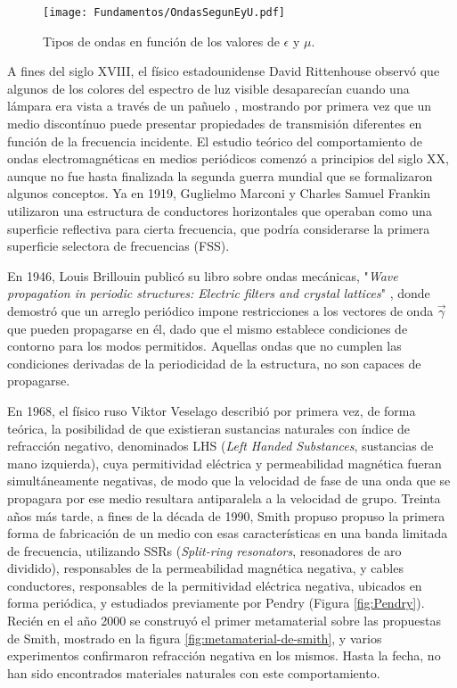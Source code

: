 \begin{figure}[htp]
	\centering
	\texttt{[image: Fundamentos/OndasSegunEyU.pdf]}
	\caption{Tipos de ondas en función de los valores de $\epsilon$ y $\mu$.}
	\label{fig:tablamuepsilon}
\end{figure}


A fines del siglo XVIII, el físico estadounidense David Rittenhouse observó que algunos de los colores del espectro de luz visible desaparecían cuando una lámpara era vista a través de un pañuelo \cite{Rittenhouse:OpticalProblem}, mostrando por primera vez que un medio discontínuo puede presentar propiedades de transmisión diferentes en función de la frecuencia incidente. El estudio teórico del comportamiento de ondas electromagnéticas en medios periódicos comenzó a principios del siglo XX, aunque no fue hasta finalizada la segunda guerra mundial que se formalizaron algunos conceptos. Ya en 1919, Guglielmo Marconi y Charles Samuel Frankin utilizaron una estructura de conductores horizontales que operaban como una superficie reflectiva para cierta frecuencia, que podría considerarse la primera superficie selectora de frecuencias (FSS).

En 1946, Louis Brillouin publicó su libro sobre ondas mecánicas, "\textit{Wave propagation in periodic structures: Electric filters and crystal lattices}" \cite{Brillouin:WavePropagation}, donde demostró que un arreglo periódico impone restricciones a los vectores de onda $\vec{\gamma}$ que pueden propagarse en él, dado que el mismo establece condiciones de contorno para los modos permitidos. Aquellas ondas que no cumplen las condiciones derivadas de la periodicidad de la estructura, no son capaces de propagarse.

En 1968, el físico ruso Viktor Veselago describió por primera vez, de forma teórica, la posibilidad de que existieran sustancias naturales con índice de refracción negativo, denominados LHS (\textit{Left Handed Substances}, sustancias de mano izquierda), cuya permitividad eléctrica y permeabilidad magnética fueran simultáneamente negativas, de modo que la velocidad de fase de una onda que se propagara por ese medio resultara antiparalela a la velocidad de grupo. Treinta años más tarde, a fines de la década de 1990, Smith propuso propuso la primera forma de fabricación de un medio con esas características en una banda limitada de frecuencia, utilizando SSRs (\textit{Split-ring resonators}, resonadores de aro dividido), responsables de la permeabilidad magnética negativa, y cables conductores, responsables de la permitividad eléctrica negativa, ubicados en forma periódica, y estudiados previamente por Pendry (Figura \ref{fig:Pendry}). Recién en el año 2000 se construyó el primer metamaterial sobre las propuestas de Smith, mostrado en la figura \ref{fig:metamaterial-de-smith}, y varios experimentos confirmaron refracción negativa en los mismos. Hasta la fecha, no han sido encontrados materiales naturales con este comportamiento.

